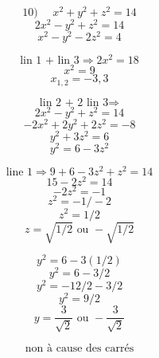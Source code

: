 \documentclass{article}
\begin{document}
\[ \text{10) } \quad x^2 + y^2 + z^2 = 14 \]
\[ 2x^2 - y^2 + z^2 = 14 \]
\[ x^2 - y^2 - 2z^2 = 4 \]

\[ \text{lin 1 + lin 3} \Rightarrow 2x^2 = 18 \]
\[ x^2 = 9 \]
\[ x_{1,2} = -3, 3 \]

\[ \text{lin 2 + 2 lin 3} \Rightarrow \]
\[ 2x^2 - y^2 + z^2 = 14 \]
\[ -2x^2 + 2y^2 + 2z^2 = -8 \]
\[ y^2 + 3z^2 = 6 \]
\[ y^2 = 6 - 3z^2 \]

\[ \text{line 1} \Rightarrow 9 + 6 - 3z^2 + z^2 = 14 \]
\[ 15 - 2z^2 = 14 \]
\[ -2z^2 = -1 \]
\[ z^2 = -1 / -2 \]
\[ z^2 = 1/2 \]
\[ z = \sqrt{1/2} \text{ ou } -\sqrt{1/2} \]

\[ y^2 = 6 - 3(1/2) \]
\[ y^2 = 6 - 3/2 \]
\[ y^2 = -12/2 - 3/2 \]
\[ y^2 = 9/2 \]
\[ y = \frac{3}{\sqrt{2}} \text{ ou } -\frac{3}{\sqrt{2}} \]

\[ \text{non à cause des carrés} \]
\end{document}
